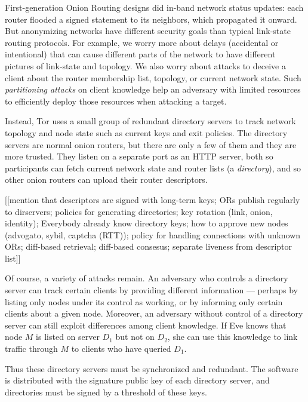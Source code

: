 \documentclass[times,10pt,twocolumn]{article}
\begin{document}
First-generation Onion Routing designs \cite{or-jsac98,freedom2-arch} did
in-band network status updates: each router flooded a signed statement
to its neighbors, which propagated it onward. But anonymizing networks
have different security goals than typical link-state routing protocols.
For example, we worry more about delays (accidental or intentional)
that can cause different parts of the network to have different pictures
of link-state and topology. We also worry about attacks to deceive a
client about the router membership list, topology, or current network
state. Such \emph{partitioning attacks} on client knowledge help an
adversary with limited resources to efficiently deploy those resources
when attacking a target.

Instead, Tor uses a small group of redundant directory servers to
track network topology and node state such as current keys and exit
policies. The directory servers are normal onion routers, but there are
only a few of them and they are more trusted. They listen on a separate
port as an HTTP server, both so participants can fetch current network
state and router lists (a \emph{directory}), and so other onion routers
can upload their router descriptors.

[[mention that descriptors are signed with long-term keys; ORs publish
    regularly to dirservers; policies for generating directories; key
    rotation (link, onion, identity); Everybody already know directory
    keys; how to approve new nodes (advogato, sybil, captcha (RTT));
    policy for handling connections with unknown ORs; diff-based
    retrieval; diff-based consesus; separate liveness from descriptor
    list]]

Of course, a variety of attacks remain. An adversary who controls a
directory server can track certain clients by providing different
information --- perhaps by listing only nodes under its control
as working, or by informing only certain clients about a given
node. Moreover, an adversary without control of a directory server can
still exploit differences among client knowledge. If Eve knows that
node $M$ is listed on server $D_1$ but not on $D_2$, she can use this
knowledge to link traffic through $M$ to clients who have queried $D_1$.

Thus these directory servers must be synchronized and redundant. The
software is distributed with the signature public key of each directory
server, and directories must be signed by a threshold of these keys.
\end{document}
